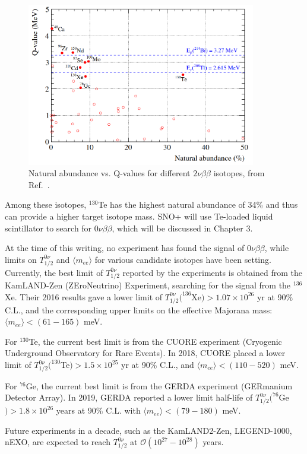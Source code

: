 \begin{figure}[!htb]
	\centering
	\includegraphics[width=10cm]{Te_abundance.png}
	\caption{Natural abundance vs. Q-values for different $2\nu\beta\beta$ isotopes, from Ref.~\cite{snop_nim_draft}.}
	\label{fig:te_abundance}
\end{figure}

Among these isotopes, $^{130}$Te has the highest natural abundance of 34\% and thus can provide a higher target isotope mass. SNO+ will use Te-loaded liquid scintillator to search for $0\nu\beta\beta$, which will be discussed in Chapter 3. 

At the time of this writing, no experiment has found the signal of $0\nu\beta\beta$, while limits on $T^{0\nu}_{1/2}$ and $\langle m_{ee}\rangle$ for various candidate isotopes have been setting. Currently, the best limit of $T^{0\nu}_{1/2}$ reported by the experiments is obtained from the KamLAND-Zen (ZEroNeutrino) Experiment, searching for the signal from the $^{136}$Xe. Their 2016 results gave a lower limit of $T^{0\nu}_{1/2}(^{136}$Xe$)>1.07\times 10^{26}$ yr at 90\% C.L., and the corresponding upper limits on the effective Majorana mass: $\langle m_{ee}\rangle<(61-165)$ meV\cite{gando2016search}. 

For $^{130}$Te, the current best limit is from the CUORE experiment (Cryogenic Underground Observatory for Rare Events). In 2018, CUORE placed a lower limit of $T^{0\nu}_{1/2}(^{130}$Te$)>1.5\times 10^{25}$ yr at 90\% C.L., and $\langle m_{ee}\rangle<(110-520)$ meV\cite{alduino2018first}.

For $^{76}$Ge, the current best limit is from the GERDA experiment (GERmanium Detector Array). In 2019, GERDA reported a lower limit half-life of $T^{0\nu}_{1/2}(^{76}$Ge$)>1.8\times 10^{26}$ years at 90\% C.L. with $\langle m_{ee}\rangle<(79-180)$ meV\cite{agostini2020final}.

Future experiments in a decade, such as the KamLAND2-Zen, LEGEND-1000, nEXO, are expected to reach $T^{0\nu}_{1/2}$ at $\mathcal{O}(10^{27}-10^{28})$ years\cite{dolinski2019neutrinoless}.